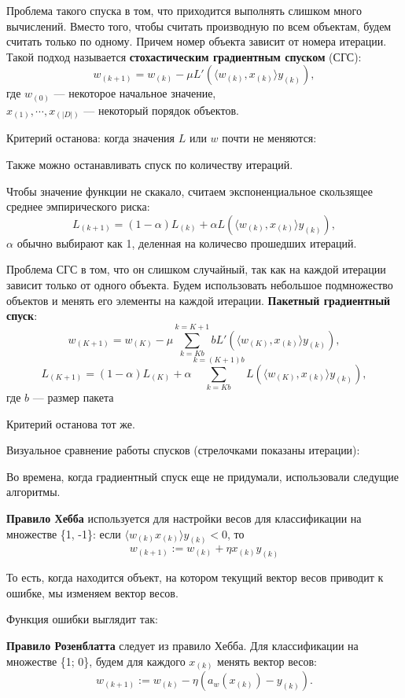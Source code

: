 Проблема такого спуска в том, что приходится выполнять слишком много
вычислений. Вместо того, чтобы считать производную по всем объектам, будем
считать только по одному. Причем номер объекта зависит от номера итерации.
Такой подход называется \textbf{стохастическим градиентным спуском} (СГС):
\[
    w_{(k+1)} = w_{(k)} - \mu L' (\langle w_{(k)}, x_{(k)} \rangle y_{(k)}),
\]
где $w_{(0)}$ --- некоторое начальное значение,\\
$x_{(1)}, \cdots, x_{(|D|)}$ --- некоторый порядок объектов.

Критерий останова: когда значения $L$ или $w$ почти не меняются:


Также можно останавливать спуск по количеству итераций.

Чтобы значение функции не скакало, считаем экспоненциальное скользящее среднее
эмпирического риска:
\[
    L_{(k+1)} = (1 - \alpha) L_{(k)} + \alpha L ( \langle w_{(k)}, x_{(k)}
    \rangle y_{(k)} ),
\]
$\alpha$ обычно выбирают как 1, деленная на количесво прошедших итераций.

Проблема СГС в том, что он слишком случайный, так как на каждой итерации
зависит только от одного объекта. Будем использовать небольшое подмножество
объектов и менять его элементы на каждой итерации. \textbf{Пакетный
градиентный спуск}:
\[
    w_{(K+1)} = w_{(K)} - \mu \sum_{k=Kb}^{k = K + 1}b L'(\langle w_{(K)},
    x_{(k)} \rangle y_{(k)}),
\]
\[
    L_{(K+1)} = (1 - \alpha) L_{(K)} + \alpha \sum_{k = Kb}^{k = (K+1)b}
    L(\langle w_{(K)}, x_{(k)} \rangle y_{(k)}),
\]
где $b$ --- размер пакета 

Критерий останова тот же.

Визуальное сравнение работы спусков (стрелочками показаны итерации):


Во времена, когда градиентный спуск еще не придумали, использовали следущие
алгоритмы.

\textbf{Правило Хебба} используется для настройки весов для классификации на
множестве
\{1, -1\}: если $\langle w_{(k)} x_{(k)} \rangle y_{(k)} < 0$, то
\[
    w_{(k+1)} := w_{(k)} + \eta x_{(k)} y_{(k)}
\]

То есть, когда находится объект, на котором текущий вектор весов приводит к
ошибке, мы изменяем вектор весов.

Функция ошибки выглядит так:


\textbf{Правило Розенблатта} следует из правило Хебба. Для классификации на
множестве \{1; 0\}, будем для каждого $x_{(k)}$ менять вектор весов:
\[
    w_{(k+1)} := w_{(k)} - \eta(a_w (x_{(k)}) - y_{(k)}).
\]

